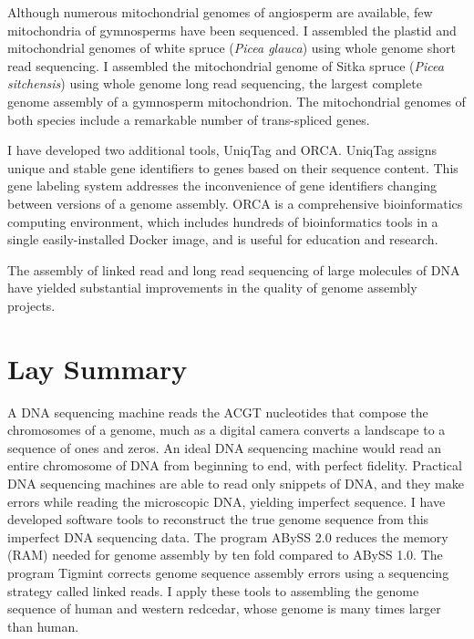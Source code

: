 \documentclass[
  12pt,
  oneside,
  openany]{book}
\begin{document}
Although numerous mitochondrial genomes of angiosperm are available, few mitochondria of gymnosperms have been sequenced. I assembled the plastid and mitochondrial genomes of white spruce (\emph{Picea glauca}) using whole genome short read sequencing. I assembled the mitochondrial genome of Sitka spruce (\emph{Picea sitchensis}) using whole genome long read sequencing, the largest complete genome assembly of a gymnosperm mitochondrion. The mitochondrial genomes of both species include a remarkable number of trans-spliced genes.

I have developed two additional tools, UniqTag and ORCA. UniqTag assigns unique and stable gene identifiers to genes based on their sequence content. This gene labeling system addresses the inconvenience of gene identifiers changing between versions of a genome assembly. ORCA is a comprehensive bioinformatics computing environment, which includes hundreds of bioinformatics tools in a single easily-installed Docker image, and is useful for education and research.

The assembly of linked read and long read sequencing of large molecules of DNA have yielded substantial improvements in the quality of genome assembly projects.

\newpage

\hypertarget{lay-summary}{%
\section*{Lay Summary}\label{lay-summary}}

A DNA sequencing machine reads the ACGT nucleotides that compose the chromosomes of a genome, much as a digital camera converts a landscape to a sequence of ones and zeros. An ideal DNA sequencing machine would read an entire chromosome of DNA from beginning to end, with perfect fidelity. Practical DNA sequencing machines are able to read only snippets of DNA, and they make errors while reading the microscopic DNA, yielding imperfect sequence. I have developed software tools to reconstruct the true genome sequence from this imperfect DNA sequencing data. The program ABySS 2.0 reduces the memory (RAM) needed for genome assembly by ten fold compared to ABySS 1.0. The program Tigmint corrects genome sequence assembly errors using a sequencing strategy called linked reads. I apply these tools to assembling the genome sequence of human and western redcedar, whose genome is many times larger than human.
\end{document}
